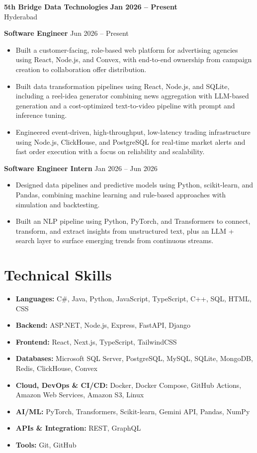 \documentclass[a4paper,11pt]{article}
\newcommand{\resumeItem}[1]{\item \small{#1}}
\newcommand{\resumeSubheading}[4]{%
  \textbf{#1} \hfill \textbf{#2} \\
{#3} \hfill {#4}
}
\newcommand{\resumeSubHeadingListStart}{\begin{itemize}}
\newcommand{\resumeSubHeadingListEnd}{\end{itemize}}
\begin{document}
\resumeSubheading
{5th Bridge Data Technologies}{Jan 2026 -- Present}
{Hyderabad}{}

\textbf{Software Engineer} \hfill {Jun 2026 -- Present}
\resumeSubHeadingListStart
\resumeItem{Built a customer-facing, role-based web platform for advertising agencies using React, Node.js, and Convex, with end-to-end ownership from campaign creation to collaboration offer distribution.}
\resumeItem{Built data transformation pipelines using React, Node.js, and SQLite, including a reel-idea generator combining news aggregation with LLM-based generation and a cost-optimized text-to-video pipeline with prompt and inference tuning.}
\resumeItem{Engineered event-driven, high-throughput, low-latency trading infrastructure using Node.js, ClickHouse, and PostgreSQL for real-time market alerts and fast order execution with a focus on reliability and scalability.}
\resumeSubHeadingListEnd

\textbf{Software Engineer Intern} \hfill {Jan 2026 -- Jun 2026}
\resumeSubHeadingListStart
\resumeItem{Designed data pipelines and predictive models using Python, scikit-learn, and Pandas, combining machine learning and rule-based approaches with simulation and backtesting.}
\resumeItem{Built an NLP pipeline using Python, PyTorch, and Transformers to connect, transform, and extract insights from unstructured text, plus an LLM + search layer to surface emerging trends from continuous streams.}
\resumeSubHeadingListEnd


\section*{Technical Skills}
\begin{itemize}
\item \textbf{Languages:} C\#, Java, Python, JavaScript, TypeScript, C++, SQL, HTML, CSS
\item \textbf{Backend:} ASP.NET, Node.js, Express, FastAPI, Django
\item \textbf{Frontend:} React, Next.js, TypeScript, TailwindCSS
\item \textbf{Databases:} Microsoft SQL Server, PostgreSQL, MySQL, SQLite, MongoDB, Redis, ClickHouse, Convex
\item \textbf{Cloud, DevOps \& CI/CD:} Docker, Docker Compose, GitHub Actions, Amazon Web Services, Amazon S3, Linux
\item \textbf{AI/ML:} PyTorch, Transformers, Scikit-learn, Gemini API, Pandas, NumPy
\item \textbf{APIs \& Integration:} REST, GraphQL
\item \textbf{Tools:} Git, GitHub
\end{itemize}
\end{document}
